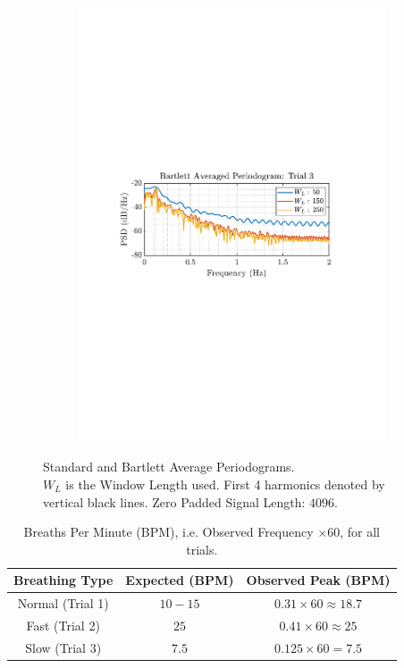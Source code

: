 \documentclass[12pt]{article}
\begin{document}
\begin{figure}[H]
\begin{subfigure}{0.49\textwidth}
			\includegraphics[trim={2.2cm 11.2cm 3.15cm  11.2cm}, clip, width=\textwidth]{../MATLAB/figures/q1_5a_fig06.pdf} 
		\end{subfigure}
		\captionsetup{justification=centering}
		\caption{Standard and Bartlett Average Periodograms. \\ 
				$W_L$ is the Window Length used. First 4 harmonics denoted by vertical black lines. Zero Padded Signal Length: $4096$.}
		\label{fig: 1-5a}
	\end{figure}

	\begin{table}[H]
		\centering
		\begin{tabular}{|c|c||c|}
			\hline
			\textbf{Breathing Type} & \textbf{Expected} (BPM) & \textbf{Observed Peak} (BPM) \\
			\hline
			\hline
			{Normal (Trial 1)} & $10-15$ & $0.31\times60\approx18.7$ \\
			\hline
			{Fast (Trial 2)} & $25$ & $0.41\times60\approx25$ \\
			\hline
			{Slow (Trial 3)} & $7.5$ & $0.125\times60=7.5$ \\
			\hline
		\end{tabular}
		\captionsetup{justification=centering}
		\caption{Breaths Per Minute (BPM), i.e. Observed Frequency $\times 60$, for all trials.}
		\label{tab: 1-5a}
	\end{table}
\end{document}
